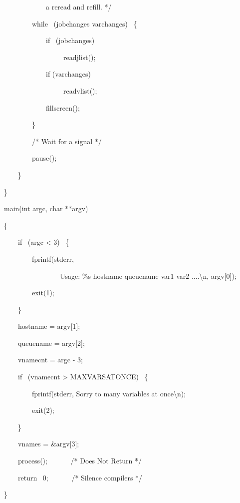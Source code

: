 \begin{exparasmall}
\ \ \ \ \ \ \ \ \ \ \ \ a reread and refill. */

\bigskip


\ \ \ \ \ \ \ \ while \ (jobchanges {\textbar}{\textbar} varchanges)
\ \{

\ \ \ \ \ \ \ \ \ \ \ \ if \ (jobchanges)

\ \ \ \ \ \ \ \ \ \ \ \ \ \ \ \ \ readjlist();

\ \ \ \ \ \ \ \ \ \ \ \ if (varchanges)

\ \ \ \ \ \ \ \ \ \ \ \ \ \ \ \ \ readvlist();

\ \ \ \ \ \ \ \ \ \ \ \ fillscreen();

\ \ \ \ \ \ \ \ \}

\bigskip


\ \ \ \ \ \ \ \ /* Wait for a signal */

\bigskip


\ \ \ \ \ \ \ \ pause();

\ \ \ \ \}

\}

\bigskip


main(int argc, char **argv)

\{

\ \ \ \ if \ (argc {\textless} 3) \ \{

\ \ \ \ \ \ \ \ fprintf(stderr,

\ \ \ \ \ \ \ \ \ \ \ \ \ \ \ \ {\textquotedbl}Usage: \%s hostname
queuename var1 var2 ....{\textbackslash}n{\textquotedbl}, argv[0]);

\ \ \ \ \ \ \ \ exit(1);

\ \ \ \ \}

\bigskip


\ \ \ \ hostname = argv[1];

\ \ \ \ queuename = argv[2];

\bigskip


\ \ \ \ vnamecnt = argc - 3;

\bigskip


\ \ \ \ if \ (vnamecnt {\textgreater} MAXVARSATONCE) \ \{

\ \ \ \ \ \ \ \ fprintf(stderr, {\textquotedbl}Sorry to many variables
at once{\textbackslash}n{\textquotedbl});

\ \ \ \ \ \ \ \ exit(2);

\ \ \ \ \}

\bigskip


\ \ \ \ vnames = \&argv[3];

\bigskip


\ \ \ \ process(); \ \ \ \ \ \ /* Does Not Return */

\ \ \ \ return \ 0; \ \ \ \ \ \ /* Silence compilers */

\}

\end{exparasmall}

